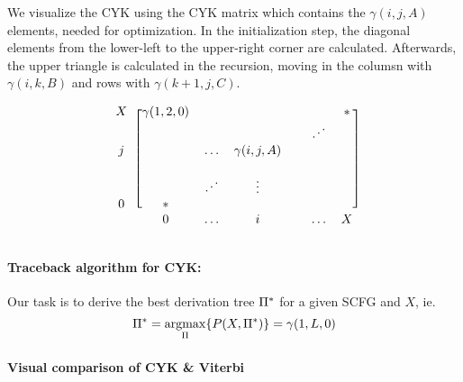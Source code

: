 We visualize the CYK using the CYK matrix which contains the \(\gamma(i,j,A)\)
elements, needed for optimization.  In the initialization step, the diagonal
elements from the lower-left to the upper-right corner are calculated.
Afterwards, the upper triangle is calculated in the recursion, moving in the
columsn with \(\gamma(i,k,B)\) and rows with \(\gamma(k+1,j,C)\).

\newcommand{\udots}{\reflectbox{$\ddots$}}
\[
\begin{blockarray}{ccccccc}
\begin{block}{c[cccccc]}
X      & \gamma(1,2,0) &        &   &               &        & * \\
       &        &        &   &               & \udots &   \\
j      &        & \hdots & \gamma(i,j,A)  &               &        &  \\
       &        &        &   &               &        &  \\
       &        & \udots & \vdots &               &        &  \\
0      & *      &        &   &               &        &  \\
\end{block}
       & 0      & \hdots & i &               & \hdots & X
\end{blockarray}
\]

\paragraph{Traceback algorithm for CYK:}  Our task is to derive the best
derivation tree \(\Pi^*\) for a given SCFG and \(X\), ie.\@
\[
  \Pi^* = \operatorname*{argmax}_{\Pi} \{ P(X,\Pi^*) \} = \gamma(1,L,0)
\]

\paragraph{Visual comparison of CYK \& Viterbi}

